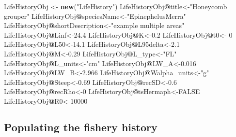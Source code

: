 \documentclass[
]{book}
\newenvironment{Shaded}{\begin{snugshade}}{\end{snugshade}}
\newcommand{\ConstantTok}[1]{\textcolor[rgb]{0.56,0.35,0.01}{#1}}
\newcommand{\DecValTok}[1]{\textcolor[rgb]{0.00,0.00,0.81}{#1}}
\newcommand{\FloatTok}[1]{\textcolor[rgb]{0.00,0.00,0.81}{#1}}
\newcommand{\FunctionTok}[1]{\textcolor[rgb]{0.13,0.29,0.53}{\textbf{#1}}}
\newcommand{\NormalTok}[1]{#1}
\newcommand{\OtherTok}[1]{\textcolor[rgb]{0.56,0.35,0.01}{#1}}
\newcommand{\SpecialCharTok}[1]{\textcolor[rgb]{0.81,0.36,0.00}{\textbf{#1}}}
\newcommand{\StringTok}[1]{\textcolor[rgb]{0.31,0.60,0.02}{#1}}
\begin{document}
\begin{Shaded}
\begin{Highlighting}[]
\NormalTok{LifeHistoryObj }\OtherTok{\textless{}{-}} \FunctionTok{new}\NormalTok{(}\StringTok{"LifeHistory"}\NormalTok{)}
\NormalTok{LifeHistoryObj}\SpecialCharTok{@}\NormalTok{title}\OtherTok{\textless{}{-}}\StringTok{"Honeycomb grouper"}
\NormalTok{LifeHistoryObj}\SpecialCharTok{@}\NormalTok{speciesName}\OtherTok{\textless{}{-}}\StringTok{"EpinephelusMerra"}
\NormalTok{LifeHistoryObj}\SpecialCharTok{@}\NormalTok{shortDescription}\OtherTok{\textless{}{-}}\StringTok{"example multiple areas"}
\NormalTok{LifeHistoryObj}\SpecialCharTok{@}\NormalTok{Linf}\OtherTok{\textless{}{-}}\FloatTok{24.4}
\NormalTok{LifeHistoryObj}\SpecialCharTok{@}\NormalTok{K}\OtherTok{\textless{}{-}}\FloatTok{0.2}
\NormalTok{LifeHistoryObj}\SpecialCharTok{@}\NormalTok{t0}\OtherTok{\textless{}{-}} \DecValTok{0}
\NormalTok{LifeHistoryObj}\SpecialCharTok{@}\NormalTok{L50}\OtherTok{\textless{}{-}}\FloatTok{14.1}
\NormalTok{LifeHistoryObj}\SpecialCharTok{@}\NormalTok{L95delta}\OtherTok{\textless{}{-}}\FloatTok{2.1}
\NormalTok{LifeHistoryObj}\SpecialCharTok{@}\NormalTok{M}\OtherTok{\textless{}{-}}\FloatTok{0.29}
\NormalTok{LifeHistoryObj}\SpecialCharTok{@}\NormalTok{L\_type}\OtherTok{\textless{}{-}}\StringTok{"FL"}
\NormalTok{LifeHistoryObj}\SpecialCharTok{@}\NormalTok{L\_units}\OtherTok{\textless{}{-}}\StringTok{"cm"}
\NormalTok{LifeHistoryObj}\SpecialCharTok{@}\NormalTok{LW\_A}\OtherTok{\textless{}{-}}\FloatTok{0.016}
\NormalTok{LifeHistoryObj}\SpecialCharTok{@}\NormalTok{LW\_B}\OtherTok{\textless{}{-}}\FloatTok{2.966}
\NormalTok{LifeHistoryObj}\SpecialCharTok{@}\NormalTok{Walpha\_units}\OtherTok{\textless{}{-}}\StringTok{"g"}
\NormalTok{LifeHistoryObj}\SpecialCharTok{@}\NormalTok{Steep}\OtherTok{\textless{}{-}}\FloatTok{0.69}
\NormalTok{LifeHistoryObj}\SpecialCharTok{@}\NormalTok{recSD}\OtherTok{\textless{}{-}}\FloatTok{0.6}
\NormalTok{LifeHistoryObj}\SpecialCharTok{@}\NormalTok{recRho}\OtherTok{\textless{}{-}}\DecValTok{0}
\NormalTok{LifeHistoryObj}\SpecialCharTok{@}\NormalTok{isHermaph}\OtherTok{\textless{}{-}}\ConstantTok{FALSE}
\NormalTok{LifeHistoryObj}\SpecialCharTok{@}\NormalTok{R0}\OtherTok{\textless{}{-}}\DecValTok{10000}
\end{Highlighting}
\end{Shaded}

\subsection{Populating the fishery history}\label{populating-the-fishery-history}
\end{document}
